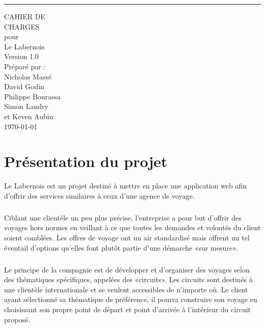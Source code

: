 \documentclass{scrreprt}
\def\myversion{1.0}
\def\projectname{Le Labernois}
\begin{document}
\begin{flushright}
    \rule{16cm}{5pt}\vskip1cm
    \begin{bfseries}
        \Huge{CAHIER DE \\ CHARGES}\\
        \vspace{1.5cm}
        pour\\
        \vspace{1.5cm}
        \projectname\\
        \vspace{1.5cm}
        \LARGE{Version \myversion}\\
        \vspace{1.5cm}
        Préparé par :\\
        Nicholas Massé\\
        David Godin\\
        Philippe Bourassa\\
        Simon Landry\\
        et Keven Aubin\\
        \vspace{1.5cm}
        \today\\
    \end{bfseries}
\end{flushright}
\newpage
{}
\tableofcontents
\newpage
{}
\chapter{Présentation du projet}

\projectname{} est un projet destiné à mettre en place une application
web afin d'offrir des services similaires à ceux d'une agence de voyage.

\paragraph{}
Ciblant une clientèle un peu plus précise, l'entreprise a pour but
d'offrir des voyages hors normes en veillant à ce que toutes les
demandes et volontés du client soient comblées. Les offres de voyage
ont un air standardisé mais offrent un tel éventail d'options qu'elles
font plutôt partie d'une démarche «sur mesure».

\paragraph{}
Le principe de la compagnie est de développer et d'organiser des
voyages selon des thématiques spécifiques, appelées des «circuits». Les
circuits sont destinés à une clientèle internationale et se veulent
accessibles de n'importe où. Le client ayant sélectionné sa thématique
de préférence, il pourra construire son voyage en choisissant son
propre point de départ et point d'arrivée à l'intérieur du circuit
proposé.
\end{document}
